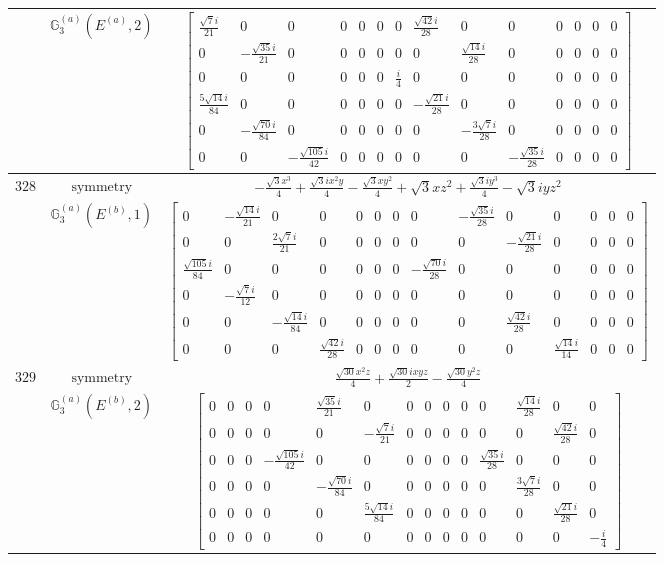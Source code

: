 \documentclass[fleqn,8pt,landscape]{jsarticle}
\begin{document}
\begin{longtable}{ccc}
$  $ & $ \mathbb{G}_{3}^{(a)}(E^{(a)},2) $ & $ \begin{bmatrix} \frac{\sqrt{7} i}{21} & 0 & 0 & 0 & 0 & 0 & 0 & \frac{\sqrt{42} i}{28} & 0 & 0 & 0 & 0 & 0 & 0 \\ 0 & - \frac{\sqrt{35} i}{21} & 0 & 0 & 0 & 0 & 0 & 0 & \frac{\sqrt{14} i}{28} & 0 & 0 & 0 & 0 & 0 \\ 0 & 0 & 0 & 0 & 0 & 0 & \frac{i}{4} & 0 & 0 & 0 & 0 & 0 & 0 & 0 \\ \frac{5 \sqrt{14} i}{84} & 0 & 0 & 0 & 0 & 0 & 0 & - \frac{\sqrt{21} i}{28} & 0 & 0 & 0 & 0 & 0 & 0 \\ 0 & - \frac{\sqrt{70} i}{84} & 0 & 0 & 0 & 0 & 0 & 0 & - \frac{3 \sqrt{7} i}{28} & 0 & 0 & 0 & 0 & 0 \\ 0 & 0 & - \frac{\sqrt{105} i}{42} & 0 & 0 & 0 & 0 & 0 & 0 & - \frac{\sqrt{35} i}{28} & 0 & 0 & 0 & 0 \end{bmatrix} $ \\ \hline
$ 328 $ & $ \text{symmetry} $ & $ - \frac{\sqrt{3} x^{3}}{4} + \frac{\sqrt{3} i x^{2} y}{4} - \frac{\sqrt{3} x y^{2}}{4} + \sqrt{3} x z^{2} + \frac{\sqrt{3} i y^{3}}{4} - \sqrt{3} i y z^{2} $ \\
$  $ & $ \mathbb{G}_{3}^{(a)}(E^{(b)},1) $ & $ \begin{bmatrix} 0 & - \frac{\sqrt{14} i}{21} & 0 & 0 & 0 & 0 & 0 & 0 & - \frac{\sqrt{35} i}{28} & 0 & 0 & 0 & 0 & 0 \\ 0 & 0 & \frac{2 \sqrt{7} i}{21} & 0 & 0 & 0 & 0 & 0 & 0 & - \frac{\sqrt{21} i}{28} & 0 & 0 & 0 & 0 \\ \frac{\sqrt{105} i}{84} & 0 & 0 & 0 & 0 & 0 & 0 & - \frac{\sqrt{70} i}{28} & 0 & 0 & 0 & 0 & 0 & 0 \\ 0 & - \frac{\sqrt{7} i}{12} & 0 & 0 & 0 & 0 & 0 & 0 & 0 & 0 & 0 & 0 & 0 & 0 \\ 0 & 0 & - \frac{\sqrt{14} i}{84} & 0 & 0 & 0 & 0 & 0 & 0 & \frac{\sqrt{42} i}{28} & 0 & 0 & 0 & 0 \\ 0 & 0 & 0 & \frac{\sqrt{42} i}{28} & 0 & 0 & 0 & 0 & 0 & 0 & \frac{\sqrt{14} i}{14} & 0 & 0 & 0 \end{bmatrix} $ \\ \hline
$ 329 $ & $ \text{symmetry} $ & $ \frac{\sqrt{30} x^{2} z}{4} + \frac{\sqrt{30} i x y z}{2} - \frac{\sqrt{30} y^{2} z}{4} $ \\
$  $ & $ \mathbb{G}_{3}^{(a)}(E^{(b)},2) $ & $ \begin{bmatrix} 0 & 0 & 0 & 0 & \frac{\sqrt{35} i}{21} & 0 & 0 & 0 & 0 & 0 & 0 & \frac{\sqrt{14} i}{28} & 0 & 0 \\ 0 & 0 & 0 & 0 & 0 & - \frac{\sqrt{7} i}{21} & 0 & 0 & 0 & 0 & 0 & 0 & \frac{\sqrt{42} i}{28} & 0 \\ 0 & 0 & 0 & - \frac{\sqrt{105} i}{42} & 0 & 0 & 0 & 0 & 0 & 0 & \frac{\sqrt{35} i}{28} & 0 & 0 & 0 \\ 0 & 0 & 0 & 0 & - \frac{\sqrt{70} i}{84} & 0 & 0 & 0 & 0 & 0 & 0 & \frac{3 \sqrt{7} i}{28} & 0 & 0 \\ 0 & 0 & 0 & 0 & 0 & \frac{5 \sqrt{14} i}{84} & 0 & 0 & 0 & 0 & 0 & 0 & \frac{\sqrt{21} i}{28} & 0 \\ 0 & 0 & 0 & 0 & 0 & 0 & 0 & 0 & 0 & 0 & 0 & 0 & 0 & - \frac{i}{4} \end{bmatrix} $ \\ \hline

\end{longtable}
\end{document}
